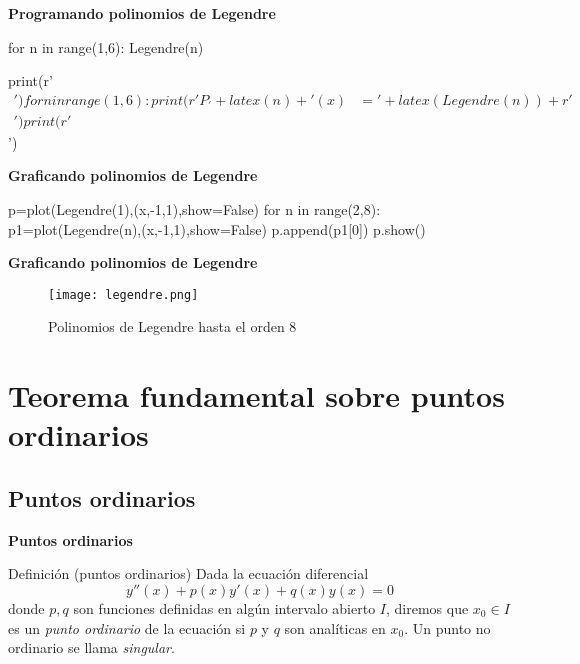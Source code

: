 \begin{frame}[fragile]{\textbf{Programando polinomios de Legendre }}



\begin{sympyblock}[][numbers=left,frame=single,framesep=5mm]
for n in range(1,6):
    Legendre(n)
\end{sympyblock}
\begin{sympycode}[][numbers=left,frame=single,framesep=5mm]
print(r'\begin{align*}') 
for n in range(1,6):
    print(r'P_'+latex(n)+'(x)&='+latex(Legendre(n))+r'\\') 
print(r'\end{align*}')
\end{sympycode}



\end{frame}


\begin{frame}[fragile]{\textbf{Graficando polinomios de Legendre }}

\begin{sympyverbatim}[][numbers=left,frame=single,framesep=5mm]
p=plot(Legendre(1),(x,-1,1),show=False)
for n in range(2,8):
    p1=plot(Legendre(n),(x,-1,1),show=False)
    p.append(p1[0])
p.show()
\end{sympyverbatim}

\end{frame}


\begin{frame}[fragile]{\textbf{Graficando polinomios de Legendre }}
\begin{figure}[h]
\begin{center}
\texttt{[image: legendre.png]}
\caption{Polinomios de Legendre hasta el orden 8}
\end{center}
\end{figure}
\end{frame}



\section{Teorema fundamental sobre puntos ordinarios}

\subsection{Puntos ordinarios}

\begin{frame}[fragile]{\textbf{Puntos ordinarios}}
\begin{block}{Definición (puntos ordinarios)} Dada la ecuación diferencial
\[y''(x)+p(x)y'(x)+q(x)y(x)=0\]
donde $p,q$ son funciones   definidas en algún intervalo abierto $I$, diremos que $x_0\in I$ es un \emph{punto ordinario} de la ecuación si $p$ y $q$ son analíticas en $x_0$. Un punto no ordinario se llama \emph{singular}.
\end{block}

\end{frame}



